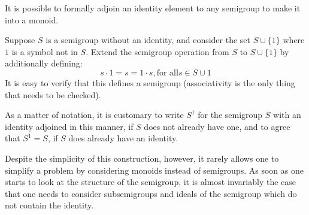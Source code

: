 \documentclass[12pt]{article}
\begin{document}
It is possible to formally adjoin an identity element to any semigroup to make it into a monoid.

Suppose $S$ is a semigroup without an identity, and consider the set $S \cup \{1\}$ where $1$ is a symbol not in $S$.  Extend the semigroup operation from $S$ to $S \cup \{1\}$ by additionally defining:
$$s \cdot 1 = s = 1 \cdot s, \text{for all} s \in S \cup {1}$$
It is easy to verify that this defines a semigroup (associativity is the only thing that needs to be checked).

As a matter of notation, it is customary to write $S^1$ for the semigroup $S$ with an identity adjoined in this manner, if $S$ does not already have one, and to agree that $S^1 = S$, if $S$ does already have an identity.

Despite the simplicity of this construction, however, it rarely allows one to simplify a problem by considering monoids instead of semigroups.  As soon as one starts to look at the structure of the semigroup, it is almost invariably the case that one needs to consider subsemigroups and ideals of the semigroup which do not contain the identity.
\end{document}
